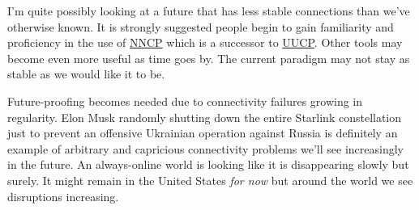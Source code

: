 I'm quite possibly looking at a future that has less stable connections
than we've otherwise known. It is strongly suggested people begin to
gain familiarity and proficiency in the use of
\href{https://nncp.mirrors.quux.org/}{NNCP} which is a successor to
\href{https://en.wikipedia.org/w/index.php?title=UUCP&oldid=1146511468}{UUCP}.
Other tools may become even more useful as time goes by. The current
paradigm may not stay as stable as we would like it to be.

Future-proofing becomes needed due to connectivity failures growing in
regularity. Elon Musk randomly shutting down the entire Starlink
constellation just to prevent an offensive Ukrainian operation against
Russia is definitely an example of arbitrary and capricious connectivity
problems we'll see increasingly in the future. An always-online world is
looking like it is disappearing slowly but surely. It might remain in
the United States \emph{for now} but around the world we see disruptions
increasing.
